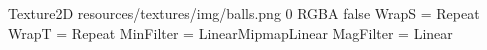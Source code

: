 Texture2D
resources/textures/img/balls.png
0
RGBA
false
WrapS = Repeat
WrapT = Repeat
MinFilter = LinearMipmapLinear
MagFilter = Linear
